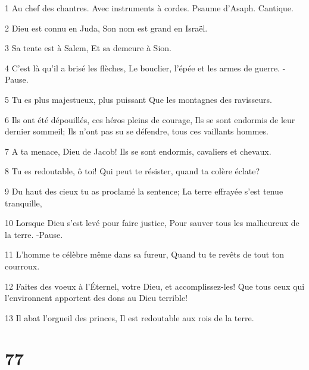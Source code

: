 \par 1 Au chef des chantres. Avec instruments à cordes. Psaume d'Asaph. Cantique.
\par 2 Dieu est connu en Juda, Son nom est grand en Israël.
\par 3 Sa tente est à Salem, Et sa demeure à Sion.
\par 4 C'est là qu'il a brisé les flèches, Le bouclier, l'épée et les armes de guerre. -Pause.
\par 5 Tu es plus majestueux, plus puissant Que les montagnes des ravisseurs.
\par 6 Ils ont été dépouillés, ces héros pleins de courage, Ils se sont endormis de leur dernier sommeil; Ils n'ont pas su se défendre, tous ces vaillants hommes.
\par 7 A ta menace, Dieu de Jacob! Ils se sont endormis, cavaliers et chevaux.
\par 8 Tu es redoutable, ô toi! Qui peut te résister, quand ta colère éclate?
\par 9 Du haut des cieux tu as proclamé la sentence; La terre effrayée s'est tenue tranquille,
\par 10 Lorsque Dieu s'est levé pour faire justice, Pour sauver tous les malheureux de la terre. -Pause.
\par 11 L'homme te célèbre même dans sa fureur, Quand tu te revêts de tout ton courroux.
\par 12 Faites des voeux à l'Éternel, votre Dieu, et accomplissez-les! Que tous ceux qui l'environnent apportent des dons au Dieu terrible!
\par 13 Il abat l'orgueil des princes, Il est redoutable aux rois de la terre.

\chapter{77}

